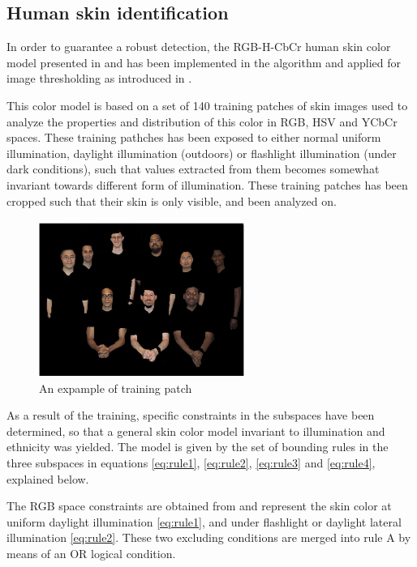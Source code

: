 \subsection{Human skin identification}
In order to guarantee a robust detection, the RGB-H-CbCr human skin color model presented in \cite{Ref:SkinColorModel} and \cite{Ref:SkinDetection} has been implemented in the algorithm and applied for image thresholding as introduced in \cite{Ref:SkinDetection}. 

This color model is based on a set of 140 training patches of skin images used to analyze the properties and
distribution of this color in RGB, HSV and YCbCr spaces.  These training pathches has been exposed to either normal uniform illumination, daylight illumination (outdoors) or flashlight illumination (under dark conditions), such that values extracted from them becomes somewhat invariant towards different form of illumination. These training patches has been cropped such that their skin is only visible, and been analyzed on. 

\begin{figure}[H]
\centering 
\includegraphics[width=0.6\textwidth]{Images/TrainingPATCH}
\caption{An expample of training patch}
\label{fig:cropImagePatch}
\end{figure}
As a result of the training, specific constraints in the subspaces have been determined, so that a general skin color model invariant to illumination and ethnicity was yielded. 
The model is given by the set of bounding rules in the three subspaces in equations \ref{eq:rule1}, \ref{eq:rule2}, \ref{eq:rule3} and \ref{eq:rule4}, explained below.

The RGB space constraints are obtained from \cite{Ref:SkinColorModel} and represent the skin color at uniform daylight illumination \ref{eq:rule1}, and under flashlight or daylight lateral illumination \ref{eq:rule2}. These two excluding conditions are merged into rule A by means of an OR logical condition.

